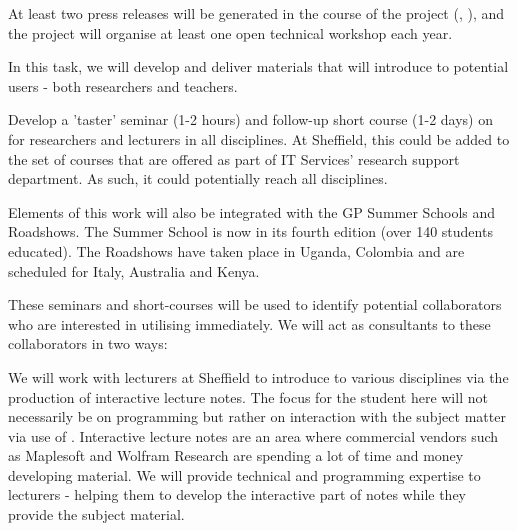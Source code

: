 \begin{workpackage}[id=dissem,wphases=18-48!.5,
  title=Dissemination,
  SARM=9,
  USORM=11,
  USHRM=8,
  USRM=24,
  UVRM=2
]
\begin{tasklist}
\begin{task}[title=Dissemination and Communication activities]

  At least two press releases will be generated in the course of the
  project (, ), and
  the project will organise at least one open technical workshop each
  year. %
  
\end{task}

\begin{task}[title=Introduce \TheProject to researchers and teachers]
In this task, we will develop and deliver materials that will introduce \TheProject to potential users - both researchers and teachers.

Develop a 'taster' seminar (1-2 hours) and follow-up short course (1-2 days) on \TheProject for researchers and lecturers in all disciplines. At Sheffield, this could be added to the set of courses that are offered as part of IT Services' research support department. As such, it could potentially reach all disciplines.

Elements of this work will also be integrated with the GP Summer Schools and Roadshows. The Summer School is now in its fourth edition (over 140 students educated). The Roadshows have taken place in Uganda, Colombia and are scheduled for Italy, Australia and Kenya.

These seminars and short-courses will be used to identify potential collaborators who are interested in utilising \TheProject immediately. We will act as consultants to these collaborators in two ways:

We will work with lecturers at Sheffield to introduce \TheProject to various disciplines via the production of interactive lecture notes. The focus for the student here will not necessarily be on programming but rather on interaction with the subject matter via use of \TheProject. Interactive lecture notes are an area where commercial vendors such as Maplesoft and Wolfram Research are spending a lot of time and money developing material. We will provide technical and programming expertise to lecturers - helping them to develop the interactive part of notes while they provide the subject material.


\end{task}
\end{tasklist}
\end{workpackage}
